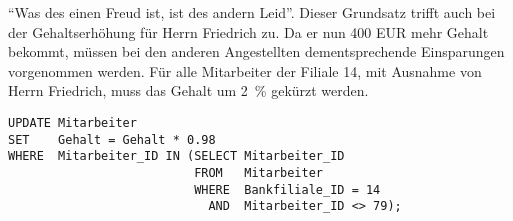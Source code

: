           \enquote{Was des einen Freud ist, ist des andern Leid}. Dieser
          Grundsatz trifft auch bei der Gehaltserhöhung für Herrn Friedrich
          zu. Da er nun 400 EUR mehr Gehalt bekommt, müssen bei den anderen
          Angestellten dementsprechende Einsparungen vorgenommen  werden. Für
          alle Mitarbeiter der Filiale 14, mit Ausnahme von Herrn Friedrich,
          muss das Gehalt um 2~\% gekürzt werden.
          \begin{lstlisting}[language=oracle_sql,caption={Gehaltskürzung für eine ganze Filiale},label=sql07_18]
UPDATE Mitarbeiter
SET    Gehalt = Gehalt * 0.98
WHERE  Mitarbeiter_ID IN (SELECT Mitarbeiter_ID
                          FROM   Mitarbeiter
                          WHERE  Bankfiliale_ID = 14
                            AND  Mitarbeiter_ID <> 79);
          \end{lstlisting}
